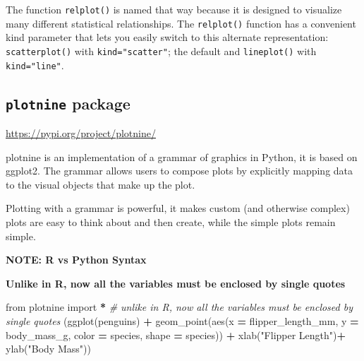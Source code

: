 \documentclass[
]{book}
\newenvironment{Shaded}{\begin{snugshade}}{\end{snugshade}}
\newcommand{\CommentTok}[1]{\textcolor[rgb]{0.56,0.35,0.01}{\textit{#1}}}
\newcommand{\ImportTok}[1]{#1}
\newcommand{\NormalTok}[1]{#1}
\newcommand{\OperatorTok}[1]{\textcolor[rgb]{0.81,0.36,0.00}{\textbf{#1}}}
\newcommand{\StringTok}[1]{\textcolor[rgb]{0.31,0.60,0.02}{#1}}
\begin{document}
The function \texttt{relplot()} is named that way because it is designed to visualize many different statistical relationships. The \texttt{relplot()} function has a convenient kind parameter that lets you easily switch to this alternate representation:
\texttt{scatterplot()} with \texttt{kind="scatter"}; the default and \texttt{lineplot()} with \texttt{kind="line"}.

\hypertarget{plotnine-package}{%
\subsection{\texorpdfstring{\texttt{plotnine} package}{plotnine package}}\label{plotnine-package}}

\url{https://pypi.org/project/plotnine/}

plotnine is an implementation of a grammar of graphics in Python, it is based on ggplot2. The grammar allows users to compose plots by explicitly mapping data to the visual objects that make up the plot.

Plotting with a grammar is powerful, it makes custom (and otherwise complex) plots are easy to think about and then create, while the simple plots remain simple.

\textbf{NOTE: R vs Python Syntax}

\textbf{Unlike in R, now all the variables must be enclosed by single quotes}

\begin{Shaded}
\begin{Highlighting}[]
\ImportTok{from}\NormalTok{ plotnine }\ImportTok{import} \OperatorTok{*}
\CommentTok{\# unlike in R, now all the variables must be enclosed by single quotes}
\NormalTok{(ggplot(penguins) }\OperatorTok{+}
\NormalTok{  geom\_point(aes(x }\OperatorTok{=} \StringTok{\textquotesingle{}flipper\_length\_mm\textquotesingle{}}\NormalTok{,}
\NormalTok{                  y }\OperatorTok{=} \StringTok{\textquotesingle{}body\_mass\_g\textquotesingle{}}\NormalTok{,}
\NormalTok{                  color }\OperatorTok{=} \StringTok{\textquotesingle{}species\textquotesingle{}}\NormalTok{,}
\NormalTok{                  shape }\OperatorTok{=} \StringTok{\textquotesingle{}species\textquotesingle{}}\NormalTok{)) }\OperatorTok{+}
\NormalTok{  xlab(}\StringTok{"Flipper Length"}\NormalTok{)}\OperatorTok{+}
\NormalTok{  ylab(}\StringTok{"Body Mass"}\NormalTok{))}
\end{Highlighting}
\end{Shaded}
\end{document}
